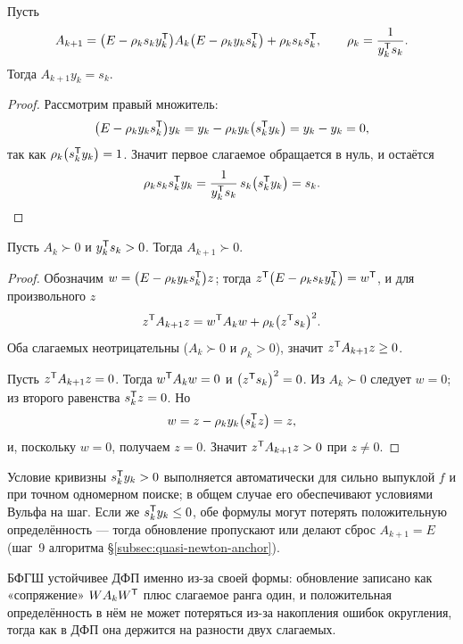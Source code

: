 \begin{theorem}\label{thm:bfgs-secant}
Пусть
\[
  A_{k+1} = \big(E - \rho_k s_k y_k^{\mathsf{T}}\big) A_k \big(E - \rho_k y_k s_k^{\mathsf{T}}\big)
            + \rho_k s_k s_k^{\mathsf{T}} ,
  \qquad \rho_k = \frac{1}{y_k^{\mathsf{T}} s_k} .
\]
Тогда $A_{k+1} y_k = s_k$.
\end{theorem}

\begin{proof}
Рассмотрим правый множитель:
\[
  \big(E - \rho_k y_k s_k^{\mathsf{T}}\big) y_k = y_k - \rho_k y_k \big(s_k^{\mathsf{T}} y_k\big)
  = y_k - y_k = 0 ,
\]
так как $\rho_k \big(s_k^{\mathsf{T}} y_k\big) = 1$. Значит первое слагаемое обращается в
нуль, и остаётся
\[
  \rho_k s_k s_k^{\mathsf{T}} y_k = \frac{1}{y_k^{\mathsf{T}} s_k}\, s_k \big(s_k^{\mathsf{T}} y_k\big) = s_k .
  \qedhere
\]
\end{proof}

\begin{theorem}\label{thm:bfgs-pd}
Пусть $A_k \succ 0$ и $y_k^{\mathsf{T}} s_k > 0$. Тогда $A_{k+1} \succ 0$.
\end{theorem}

\begin{proof}
Обозначим $w = \big(E - \rho_k y_k s_k^{\mathsf{T}}\big) z$; тогда
$z^{\mathsf{T}}\big(E - \rho_k s_k y_k^{\mathsf{T}}\big) = w^{\mathsf{T}}$, и для произвольного $z$
\[
  z^{\mathsf{T}} A_{k+1} z = w^{\mathsf{T}} A_k w + \rho_k \big(z^{\mathsf{T}} s_k\big)^2 .
\]
Оба слагаемых неотрицательны ($A_k \succ 0$ и $\rho_k > 0$), значит
$z^{\mathsf{T}} A_{k+1}z \ge 0$.

Пусть $z^{\mathsf{T}} A_{k+1}z = 0$. Тогда $w^{\mathsf{T}} A_k w = 0$ и $\big(z^{\mathsf{T}} s_k\big)^2 = 0$.
Из $A_k \succ 0$ следует $w = 0$; из второго равенства $s_k^{\mathsf{T}} z = 0$. Но
\[
  w = z - \rho_k y_k \big(s_k^{\mathsf{T}} z\big) = z ,
\]
и, поскольку $w = 0$, получаем $z = 0$. Значит $z^{\mathsf{T}} A_{k+1}z > 0$ при
$z \ne 0$.
\end{proof}

\begin{idea}
Условие кривизны $s_k^{\mathsf{T}} y_k > 0$ выполняется автоматически для сильно выпуклой
$f$ и при точном одномерном поиске; в общем случае его обеспечивают условиями
Вульфа на шаг. Если же $s_k^{\mathsf{T}} y_k \le 0$, обе формулы могут потерять
положительную определённость — тогда обновление пропускают или делают сброс
$A_{k+1} = E$ (шаг~9 алгоритма §\ref{subsec:quasi-newton-anchor}).

БФГШ устойчивее ДФП именно из-за своей формы: обновление записано как
«сопряжение» $W A_k W^{\mathsf{T}}$ плюс слагаемое ранга один, и положительная
определённость в нём не может потеряться из-за накопления ошибок округления,
тогда как в ДФП она держится на разности двух слагаемых.
\end{idea}
